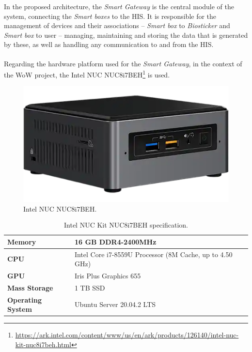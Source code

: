 In the proposed architecture, the \textit{Smart Gateway} is the central module of the system, connecting the \textit{Smart boxes} to the \acs{HIS}. It is responsible for the management of devices and their associations -- \textit{Smart box} to \textit{Biosticker} and \textit{Smart box} to user -- managing, maintaining and storing the data that is generated by these, as well as handling any communication to and from the \acs{HIS}. 


\paragraph{} Regarding the hardware platform used for the \textit{Smart Gateway}, in the context of the \acs{WoW} project, the Intel NUC NUC8i7BEH\footnote{\url{https://ark.intel.com/content/www/us/en/ark/products/126140/intel-nuc-kit-nuc8i7beh.html}} is used.


\begin{figure}[H]
    \centering
    \includegraphics[width=0.4\linewidth]{images/gateway-image.png}
    \caption[Intel NUC NUC8i7BEH.]{Intel NUC NUC8i7BEH.}
    \label{fig:gateway_image}
\end{figure}

\begin{table}[H]
    \centering
    \caption{Intel NUC Kit NUC8i7BEH specification.}
    \label{tab:NUCspecification}
    \begin{tabular}{l|l}
    \hline
     \textbf{Memory}                     & 16 GB DDR4-2400MHz                                   \\ \hline
     \textbf{CPU}                        & Intel Core i7-8559U Processor (8M Cache, up to 4.50 GHz) \\ \hline
     \textbf{GPU}                         & Iris Plus Graphics 655                                     \\ \hline
     \textbf{Mass Storage}               & 1 TB SSD                                                      \\ \hline %
     \textbf{Operating System}           & Ubuntu Server 20.04.2 LTS                                  \\ \hline
    \end{tabular}
\end{table}

